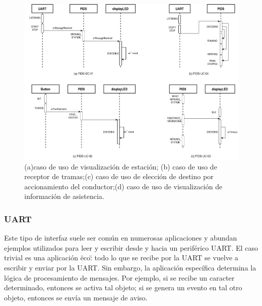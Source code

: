 \begin{figure}[ht]
	\centering
	\includegraphics[width=1\textwidth]{../Figures/secuenciasSistema.png}
	\caption{(a)caso de uso de visualización de estación; (b) caso de uso de receptor de tramas;(c) caso de uso de elección de destino por accionamiento del conductor;(d) caso de uso de visualización de información de asistencia.}
	\label{fig:diagramaSecuenciaSistema}
\end{figure}



\subsubsection{UART}

 Este tipo de interfaz suele ser común en numerosas aplicaciones y abundan ejemplos utilizados para leer y escribir desde y hacia un periférico UART. El caso trivial es una aplicación \"eco\": todo lo que se recibe por la UART se vuelve a escribir y enviar por la UART. Sin embargo, la aplicación específica determina la lógica de procesamiento de mensajes. Por ejemplo, si se recibe un caracter determinado, entonces se activa tal objeto; si se genera un evento en tal otro objeto, entonces se envía un mensaje de aviso. \\

